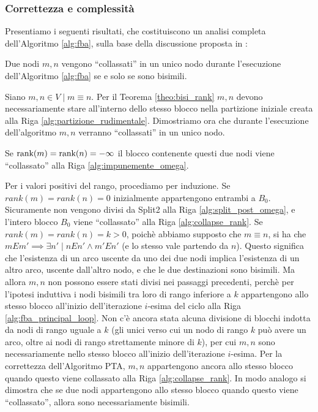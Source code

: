\subsubsection{Correttezza e complessità}
Presentiamo i seguenti risultati, che costituiscono un analisi completa dell'Algoritmo \ref{alg:fba}, sulla base della discussione proposta in \cite{dovier}:
\begin{theorem}
    Due nodi $m,n$ vengono ``collassati'' in un unico nodo durante l'esecuzione dell'Algoritmo \ref{alg:fba} se e solo se sono bisimili.
\end{theorem}
\begin{proof2}
    Siano $m,n \in V \mid m \equiv n$. Per il Teorema \ref{theo:bisi_rank} $m,n$ devono necessariamente stare all'interno dello stesso blocco nella partizione iniziale creata alla Riga \ref{alg:partizione_rudimentale}. Dimostriamo ora che durante l'esecuzione dell'algoritmo $m,n$ verranno ``collassati'' in un unico nodo.

    Se $\textup{rank}(m) = \textup{rank}(n) = -\infty$ il blocco contenente questi due nodi viene ``collassato'' alla Riga \ref{alg:impunemente_omega}.

    Per i valori positivi del rango, procediamo per induzione. Se $rank(m) = rank(n) = 0$ inizialmente appartengono entrambi a $B_0$. Sicuramente non vengono divisi da Split2 alla Riga \ref{alg:split_post_omega}, e l'intero blocco $B_0$ viene ``collassato'' alla Riga \ref{alg:collapse_rank}. Se $rank(m) = rank(n) = k > 0$, poichè abbiamo supposto che $m \equiv n$, si ha che $m E m' \implies \exists n' \mid n E n' \land m' E n'$ (e lo stesso vale partendo da $n$). Questo significa che l'esistenza di un arco uscente da uno dei due nodi implica l'esistenza di un altro arco, uscente dall'altro nodo, e che le due destinazioni sono bisimili. Ma allora $m,n$ non possono essere stati divisi nei passaggi precedenti, perchè per l'ipotesi induttiva i nodi bisimili tra loro di rango inferiore a $k$ appartengono allo stesso blocco all'inizio dell'iterazione $i$-esima del ciclo alla Riga \ref{alg:fba_principal_loop}. Non c'è ancora stata alcuna divisione di blocchi indotta da nodi di rango uguale a $k$ (gli unici verso cui un nodo di rango $k$ può avere un arco, oltre ai nodi di rango strettamente minore di $k$), per cui $m,n$ sono necessariamente nello stesso blocco all'inizio dell'iterazione $i$-esima. Per la correttezza dell'Algoritmo PTA, $m,n$ appartengono ancora allo stesso blocco quando questo viene collassato alla Riga \ref{alg:collapse_rank}. In modo analogo si dimostra che se due nodi appartengono allo stesso blocco quando questo viene ``collassato'', allora sono necessariamente bisimili.
\end{proof2}

